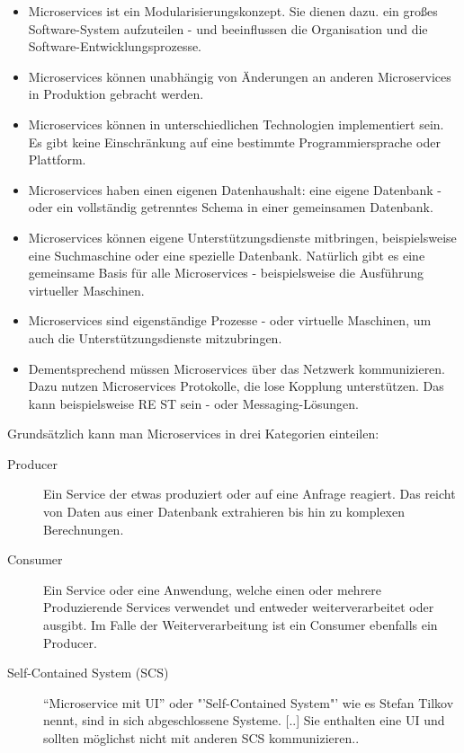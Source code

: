 \begin{itemize}
    \item Microservices ist ein Modularisierungskonzept. Sie dienen dazu. ein großes Software-System aufzuteilen - und beeinflussen die Organisation und die Software-Entwicklungsprozesse.
    \item Microservices können unabhängig von Änderungen an anderen Microservices in Produktion gebracht werden.
    \item Microservices können in unterschiedlichen Technologien implementiert sein. Es gibt keine Einschränkung auf eine bestimmte Programmiersprache oder Plattform.
    \item Microservices haben einen eigenen Datenhaushalt: eine eigene Datenbank - oder ein vollständig getrenntes Schema in einer gemeinsamen Datenbank.
    \item Microservices können eigene Unterstützungsdienste mitbringen, beispielsweise eine Suchmaschine oder eine spezielle Datenbank. Natürlich gibt es eine gemeinsame Basis für alle Microservices - beispielsweise die Ausführung virtueller Maschinen.
    \item Microservices sind eigenständige Prozesse - oder virtuelle Maschinen, um auch die Unterstützungsdienste mitzubringen.
    \item Dementsprechend müssen Microservices über das Netzwerk kommunizieren. Dazu nutzen Microservices Protokolle, die lose Kopplung unterstützen. Das kann beispielsweise RE
    ST sein - oder Messaging-Lösungen.
\end{itemize}

Grundsätzlich kann man Microservices in drei Kategorien einteilen:
\begin{description}
    \item[Producer] Ein Service der etwas produziert oder auf eine Anfrage reagiert. Das reicht von Daten aus einer Datenbank extrahieren bis hin zu komplexen Berechnungen.
    \item[Consumer] Ein Service oder eine Anwendung, welche einen oder mehrere Produzierende Services verwendet und entweder weiterverarbeitet oder ausgibt. Im Falle der Weiterverarbeitung ist ein Consumer ebenfalls ein Producer.
    \item[Self-Contained System (SCS)] \frqq "`Microservice mit UI"' oder "'Self-Contained System"' wie es Stefan Tilkov nennt, sind in sich abgeschlossene Systeme. [..] Sie enthalten eine UI und sollten möglichst nicht mit anderen SCS kommunizieren.\flqq \cite[vgl S. 55]{EWolff2016:Microservices}.
\end{description}


